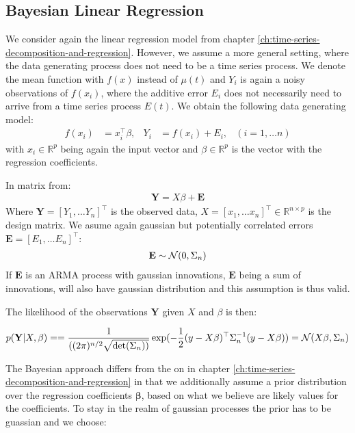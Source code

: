 \subsection{Bayesian Linear Regression}

We consider again the linear regression model from chapter \ref{ch:time-series-decomposition-and-regression}.
However, we assume a more general setting, where the data generating process does not need to be a time series process.
We denote the mean function with $f(x)$ instead of $\mu(t)$ and $Y_i$ is again a noisy observations of
$f(x_i)$, where the additive error $E_i$ does not necessarily need to arrive from a time series process $E(t)$.
We obtain the following data generating model:
\begin{align*}
    f(x_i) &= x_i^{\top}\beta, & Y_i &= f(x_i) + E_i,  & (i = 1, \dots n)
\end{align*}
with $x_i \in \mathbb{R}^p$ being again the input vector and $\beta \in \mathbb{R}^p$ is the vector with
the regression coefficients.

In matrix from:
\begin{align*}
    \mathbf{Y} = X \beta + \mathbf{E}
\end{align*}
Where $\mathbf{Y} = [Y_{1}, \dots Y_{n}]^{\top}$ is the observed data,
$X = [x_{1}, \dots x_{n}]^{\top} \in \mathbb{R}^{n \times p}$ is the design matrix.
We asume again gaussian but potentially correlated errors $\mathbf{E} = [E_{1}, \dots E_{n}]^{\top}$:
\begin{gather*}
    \mathbf{E} \sim \operatorname{\mathcal{N}}(0, \Sigma_n)
\end{gather*}
If $\mathbf{E}$ is an ARMA process with gaussian innovations,
$\mathbf{E}$ being a sum of innovations, will also have gaussian distribution and
this assumption is thus valid.

The likelihood of the observations $\mathbf{Y}$ given $X$ and $\beta$ is then:

\begin{gather*}
    p(\mathbf{Y}|X,\beta) =
    = \frac{1}{( (2\pi)^{n/2} \sqrt {\det(\Sigma_n))}}
    \exp(-\frac{1}{2}(y - X\beta)^{\top} \Sigma_n^{-1}(y-X\beta))
    = \operatorname{\mathcal{N}}(X \beta, \Sigma_n)
\end{gather*}

The Bayesian approach differs from the on in chapter \ref{ch:time-series-decomposition-and-regression} in
that we additionally assume a prior distribution over the regression coefficients $\boldsymbol{\beta}$, based on
what we believe are likely values for the coefficients.
To stay in the realm of gaussian processes the prior has to be guassian and we choose:

